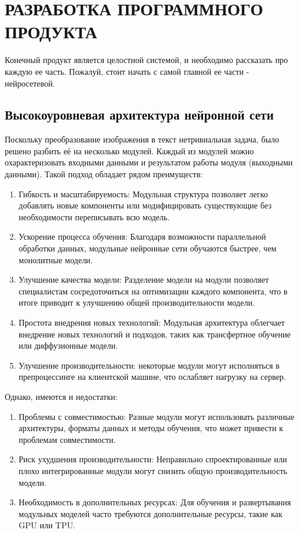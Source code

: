 \section{РАЗРАБОТКА ПРОГРАММНОГО ПРОДУКТА}

Конечный продукт является целостной системой, и необходимо рассказать про каждую ее часть. Пожалуй, стоит начать с самой главной ее части - нейросетевой.
\subsection{Высокоуровневая архитектура нейронной сети}

Поскольку преобразование изображения в текст нетривиальная задача, было решено разбить её на несколько модулей. Каждый из модулей можно охарактеризовать входными данными и результатом работы модуля (выходными данными).
Такой подход обладает рядом преимуществ:
\begin{enumerate}
    \item Гибкость и масштабируемость: Модульная структура позволяет легко добавлять новые компоненты или модифицировать существующие без необходимости переписывать всю модель.
    \item Ускорение процесса обучения: Благодаря возможности параллельной обработки данных, модульные нейронные сети обучаются быстрее, чем монолитные модели.
    \item Улучшение качества модели: Разделение модели на модули позволяет специалистам сосредоточиться на оптимизации каждого компонента, что в итоге приводит к улучшению общей производительности модели.
    \item Простота внедрения новых технологий: Модульная архитектура облегчает внедрение новых технологий и подходов, таких как трансфертное обучение или диффузионные модели.
    \item Улучшение производительности: некоторые модули могут исполняться в препроцессинге на клиентской машине, что ослабляет нагрузку на сервер.
\end{enumerate}
Однако, имеются и недостатки:
\begin{enumerate}
    \item Проблемы с совместимостью: Разные модули могут использовать различные архитектуры, форматы данных и методы обучения, что может привести к проблемам совместимости.
    \item Риск ухудшения производительности: Неправильно спроектированные или плохо интегрированные модули могут снизить общую производительность модели.
    \item Необходимость в дополнительных ресурсах: Для обучения и развертывания модульных моделей часто требуются дополнительные ресурсы, такие как GPU или TPU.
\end{enumerate}

